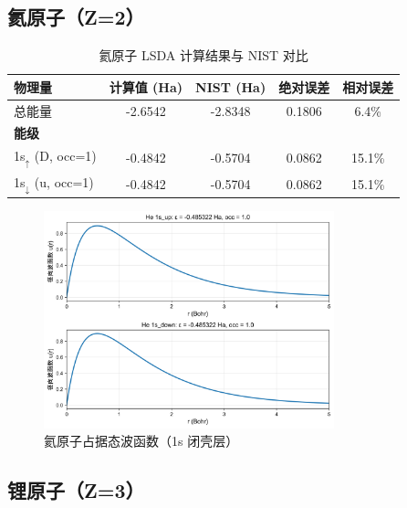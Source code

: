 \documentclass[12pt,a4paper]{article}
\begin{document}
\subsection{氦原子（Z=2）}

\begin{table}[H]
    \centering
    \caption{氦原子 LSDA 计算结果与 NIST 对比}
    \begin{tabular}{lcccc}
        \toprule
        物理量                        & 计算值 (Ha) & NIST (Ha) & 绝对误差   & 相对误差   \\
        \midrule
        总能量                        & -2.6542  & -2.8348   & 0.1806 & 6.4\%  \\
        \midrule
        \multicolumn{5}{l}{\textbf{能级}}                                     \\
        1s$_\uparrow$ (D, occ=1)   & -0.4842  & -0.5704   & 0.0862 & 15.1\% \\
        1s$_\downarrow$ (u, occ=1) & -0.4842  & -0.5704   & 0.0862 & 15.1\% \\
        \bottomrule
    \end{tabular}
\end{table}

\begin{figure}[H]
    \centering
    \includegraphics[width=0.75\textwidth]{figures/He_lsda.png}
    \caption{氦原子占据态波函数（1s 闭壳层）}
\end{figure}

\subsection{锂原子（Z=3）}
\end{document}
